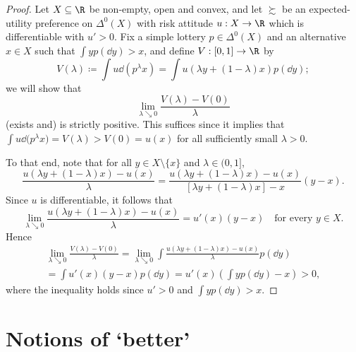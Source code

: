 \begin{proof}
	Let $X \subseteq \R$ be non-empty, open and convex, and let $\succsim$ be an expected-utility preference on $\Delta^0(X)$ with risk attitude $u : X \to \R$ which is differentiable with $u'>0$. Fix a simple lottery $p \in \Delta^0(X)$ and an alternative $x \in X$ such that $\int y p(\dd y) > x$, and define $V : [0,1] \to \R$ by
	\begin{equation*}
		V(\lambda)
		\coloneqq \int u \dd \left( p^\lambda x \right)
		= \int u( \lambda y + (1-\lambda) x ) p(\dd y) ;
	\end{equation*}
	we will show that
	\begin{equation*}
		\lim_{\lambda \searrow 0} \frac{V(\lambda)-V(0)}{\lambda} 
	\end{equation*}
	(exists and) is strictly positive. This suffices since it implies that $\int u \dd \bigl( p^\lambda x \bigr) = V(\lambda) > V(0) = u(x)$ for all sufficiently small $\lambda>0$.

	To that end, note that for all $y \in X \setminus \{x\}$ and $\lambda \in (0,1]$,
	\begin{equation*}
		\frac{ u( \lambda y + (1-\lambda) x ) - u(x) }{\lambda}
		= \frac{ u( \lambda y + (1-\lambda) x ) - u(x) }{ [ \lambda y + (1-\lambda) x ] - x } (y-x) .
	\end{equation*}
	Since $u$ is differentiable, it follows that
	\begin{equation*}
		\lim_{\lambda \searrow 0} \frac{ u( \lambda y + (1-\lambda) x ) - u(x) }{\lambda}
		= u'(x) (y-x) 
		\quad \text{for every $y \in X$.}
	\end{equation*}
	Hence
	\begin{multline*}
		\lim_{\lambda \searrow 0} \frac{V(\lambda)-V(0)}{\lambda}
		= \lim_{\lambda \searrow 0} \int \frac{ u( \lambda y + (1-\lambda) x ) - u(x) }{\lambda} p( \dd y )
		\\
		= \int u'(x) (y-x) p(\dd y)
		= u'(x) \left( \int y p(\dd y) - x \right)
		> 0 ,
	\end{multline*}
	where the inequality holds since $u'>0$ and $\int y p(\dd y) > x$.
\end{proof}



\section[Notions of \texorpdfstring{`better'}{'better'} \emph{(not yet written)}]{Notions of `better'}
\label{mone:stoch_high}

